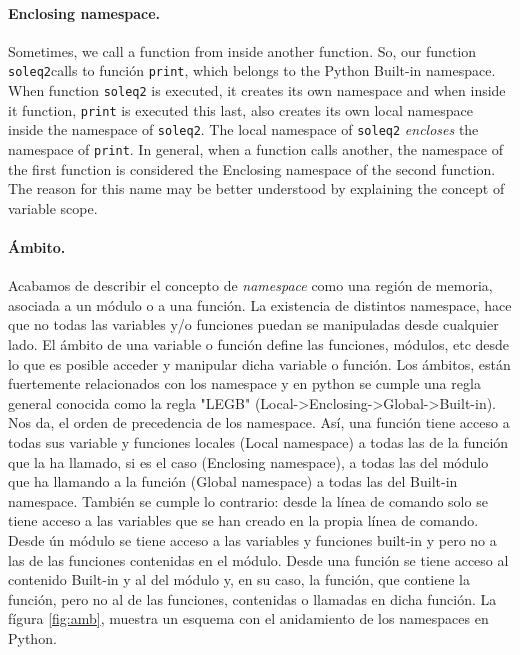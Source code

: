 \begin{paracol}{2}
\paragraph{Enclosing namespace.} Sometimes, we call a function from inside another function. So, our function \texttt{soleq2}calls to función \texttt{print}, which belongs to the Python Built-in namespace. When function \texttt{soleq2} is executed, it creates its own namespace and when inside it function, \texttt{print} is executed this last, also creates its own local namespace inside the namespace of \texttt{soleq2}. The local namespace of \texttt{soleq2} \emph{encloses} the namespace of \texttt{print}. 
In general, when a function calls another, the namespace of the first function is considered the Enclosing namespace of the second function. The reason for this name may be better understood by explaining the concept of variable scope.

\switchcolumn
\paragraph{Ámbito.} Acabamos de describir el concepto de \emph{namespace} como una región de memoria, asociada a un módulo o a una función. La existencia de distintos namespace, hace que no todas las variables y/o funciones puedan se manipuladas desde cualquier lado. El ámbito de una variable o función define las funciones, módulos, etc desde lo que es posible acceder y manipular dicha variable o función. Los ámbitos, están fuertemente relacionados con los namespace y en python se cumple una regla general conocida como la regla "LEGB" (Local-\textgreater Enclosing-\textgreater Global-\textgreater Built-in). Nos da, el orden de precedencia de los namespace. Así, una función tiene acceso a todas sus variable y funciones locales (Local namespace) a todas las de la función que la ha llamado, si es el caso (Enclosing namespace), a todas las del módulo que ha llamando a la función (Global namespace) a todas las del Built-in namespace. También se cumple lo contrario: desde la línea de comando solo se tiene acceso a las variables que se han creado en la propia línea de comando. Desde ún módulo se tiene acceso a las variables y funciones built-in y pero no a las de las funciones contenidas en el módulo.
Desde una función se tiene acceso al contenido Built-in y al del módulo y, en su caso, la función, que contiene la función, pero no al de las funciones, contenidas o llamadas en dicha función.
La fígura \ref{fig:amb}, muestra un esquema con el anidamiento de los namespaces en Python.
\switchcolumn

\end{paracol}

